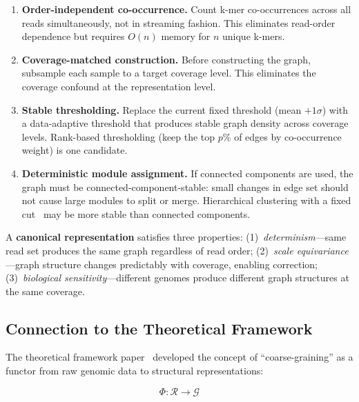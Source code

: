\documentclass{../yalumba}
\begin{document}
\begin{enumerate}
  \item \textbf{Order-independent co-occurrence.}  Count k-mer
    co-occurrences across all reads simultaneously, not in streaming
    fashion.  This eliminates read-order dependence but requires
    $O(n)$ memory for $n$ unique k-mers.
  \item \textbf{Coverage-matched construction.}  Before constructing
    the graph, subsample each sample to a target coverage level.  This
    eliminates the coverage confound at the representation level.
  \item \textbf{Stable thresholding.}  Replace the current fixed
    threshold (mean $+ 1\sigma$) with a data-adaptive threshold
    that produces stable graph density across coverage levels.
    Rank-based thresholding (keep the top $p\%$ of edges by
    co-occurrence weight) is one candidate.
  \item \textbf{Deterministic module assignment.}  If connected
    components are used, the graph must be connected-component-stable:
    small changes in edge set should not cause large modules to split
    or merge.  Hierarchical clustering with a fixed
    cut~\cite{langfelder2008wgcna} may be more stable than connected
    components.
\end{enumerate}

\begin{definition}
A \textbf{canonical representation} satisfies three properties:
(1)~\emph{determinism}---same read set produces the same graph
regardless of read order; (2)~\emph{scale equivariance}---graph
structure changes predictably with coverage, enabling correction;
(3)~\emph{biological sensitivity}---different genomes produce
different graph structures at the same coverage.
\end{definition}

\subsection{Connection to the Theoretical Framework}
\label{sec:theory-connection}

The theoretical framework paper~\cite{nakahara2003geometry} developed
the concept of ``coarse-graining'' as a functor from raw genomic data
to structural representations:

\begin{equation}
  \Phi: \mathcal{R} \to \mathcal{G}
  \label{eq:functor}
\end{equation}
\end{document}
